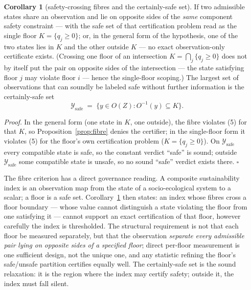 \documentclass[11pt]{article}
\theoremstyle{definition}
\newtheorem{corollary}{Corollary}
\begin{document}
\begin{corollary}[safety-crossing fibres and the certainly-safe set]\label{cor:certainly-safe} If two admissible states share an observation and lie on opposite
sides of the \emph{same} component safety constraint --- with the safe
set of that certification problem read as the single floor
\(K = \{ q_j \ge 0 \}\); or, in the general form of the hypothesis, one
of the two states lies in \(K\) and the other outside \(K\) --- no exact
observation-only certificate exists. (Crossing one floor of an
intersection \(K = \bigcap_j \{ q_j \ge 0 \}\) does not by itself put
the pair on opposite sides of the intersection --- the state satisfying
floor \(j\) may violate floor \(i\) --- hence the single-floor scoping.)
The largest set of observations that can soundly be labeled safe without
further information is the certainly-safe set
\[\mathcal{Y}_{\mathrm{safe}} \;=\; \big\{ y \in O(Z) : O^{-1}(y) \subseteq K \big\}.\]

\end{corollary}

\emph{Proof.} In the general form (one state in \(K\), one outside), the
fibre violates (5) for that \(K\), so Proposition~\ref{prop:fibre} denies the certifier; in
the single-floor form it violates (5) for the floor's own certification
problem (\(K = \{q_j \ge 0\}\)). On \(\mathcal{Y}_{\mathrm{safe}}\)
every compatible state is safe, so the constant verdict ``safe'' is
sound; outside \(\mathcal{Y}_{\mathrm{safe}}\) some compatible state is
unsafe, so no sound ``safe'' verdict exists there. \ensuremath{\square}

The fibre criterion has a direct governance reading. A composite
sustainability index is an observation map from the state of a
socio-ecological system to a scalar; a floor is a safe set. Corollary~\ref{cor:certainly-safe}
then states: an index whose fibres cross a floor boundary --- whose
value cannot distinguish a state violating the floor from one satisfying
it --- cannot support an exact certification of that floor, however
carefully the index is thresholded. The structural requirement is not
that each floor be measured separately, but that the observation
\emph{separate every admissible pair lying on opposite sides of a specified floor}; direct per-floor measurement is one sufficient design,
not the unique one, and any statistic refining the floor's safe/unsafe
partition certifies equally well. The certainly-safe set is the sound relaxation: it is the region where the index may certify safety; outside
it, the index must fall silent.
\end{document}
